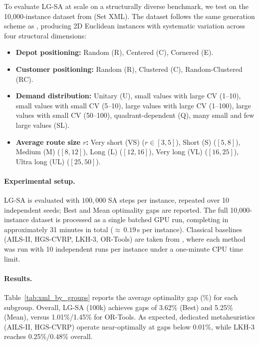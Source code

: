 \documentclass[letterpaper]{article} %
\begin{document}
To evaluate LG-SA at scale on a structurally diverse benchmark, we test on the 10,000-instance dataset from \citet{queiroga_10000_nodate} (Set XML). The dataset follows the same generation scheme as \citet{uchoa_new_2017}, producing 2D Euclidean instances with systematic variation across four structural dimensions:
\begin{itemize}
    \item \textbf{Depot positioning:} Random (R), Centered (C), Cornered (E).
    \item \textbf{Customer positioning:} Random (R), Clustered (C), Random-Clustered (RC).
    \item \textbf{Demand distribution:} Unitary (U), small values with large CV (1--10), small values with small CV (5--10), large values with large CV (1--100), large values with small CV (50--100), quadrant-dependent (Q), many small and few large values (SL).
    \item \textbf{Average route size $r$:} Very short (VS) ($r \in [3,5]$), Short (S) ($[5,8]$), Medium (M) ($[8,12]$), Long (L) ($[12,16]$), Very long (VL) ($[16,25]$), Ultra long (UL) ($[25,50]$).
\end{itemize}

\paragraph{Experimental setup.}
LG-SA is evaluated with $100{,}000$ SA steps per instance, repeated over 10 independent seeds; Best and Mean optimality gaps are reported. The full 10,000-instance dataset is processed as a single batched GPU run, completing in approximately 31 minutes in total ($\approx$\,$0.19$\,s per instance). Classical baselines (AILS-II, HGS-CVRP, LKH-3, OR-Tools) are taken from \citet{queiroga_10000_nodate}, where each method was run with 10 independent runs per instance under a one-minute CPU time limit.

\paragraph{Results.}
Table~\ref{tab:xml_by_groups} reports the average optimality gap (\%) for each subgroup. Overall, LG-SA (100k) achieves gaps of 3.62\% (Best) and 5.25\% (Mean), versus 1.01\%/1.45\% for OR-Tools. As expected, dedicated metaheuristics (AILS-II, HGS-CVRP) operate near-optimally at gaps below 0.01\%, while LKH-3 reaches 0.25\%/0.48\% overall.
\end{document}
